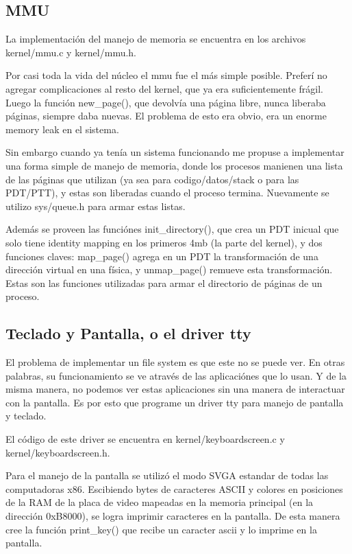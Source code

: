 \subsection{MMU}

La implementación del manejo de memoria se encuentra en los archivos
kernel/mmu.c y kernel/mmu.h.

Por casi toda la vida del núcleo el mmu fue el más simple posible. Preferí no
agregar complicaciones al resto del kernel, que ya era suficientemente frágil.
Luego la función new_page(), que devolvía una página libre, nunca liberaba
páginas, siempre daba nuevas. El problema de esto era obvio, era un enorme
memory leak en el sistema.

Sin embargo cuando ya tenía un sistema funcionando me propuse a implementar una
forma simple de manejo de memoria, donde los procesos manienen una lista de las
páginas que utilizan (ya sea para codigo/datos/stack o para las PDT/PTT), y
estas son liberadas cuando el proceso termina. Nuevamente se utilizo
sys/queue.h para armar estas listas.

Además se proveen las funciónes init\_directory(), que crea un PDT inicual que
solo tiene identity mapping en los primeros 4mb (la parte del kernel), y dos
funciones claves: map\_page() agrega en un PDT la transformación de una
dirección virtual en una física, y unmap\_page() remueve esta transformación.
Estas son las funciones utilizadas para armar el directorio de páginas de un
proceso.

\subsection{Teclado y Pantalla, o el driver tty}

El problema de implementar un file system es que este no se puede ver. En otras
palabras, su funcionamiento se ve através de las aplicaciónes que lo usan. Y de
la misma manera, no podemos ver estas aplicaciones sin una manera de
interactuar con la pantalla. Es por esto que programe un driver tty para manejo
de pantalla y teclado.

El código de este driver se encuentra en kernel/keyboardscreen.c y
kernel/keyboardscreen.h.

Para el manejo de la pantalla se utilizó el modo SVGA estandar de todas las
computadoras x86. Escibiendo bytes de caracteres ASCII y colores en posiciones
de la RAM de la placa de video mapeadas en la memoria principal (en la
dirección 0xB8000), se logra imprimir caracteres en la pantalla. De esta manera
cree la función print\_key() que recibe un caracter ascii y lo imprime en la
pantalla.

